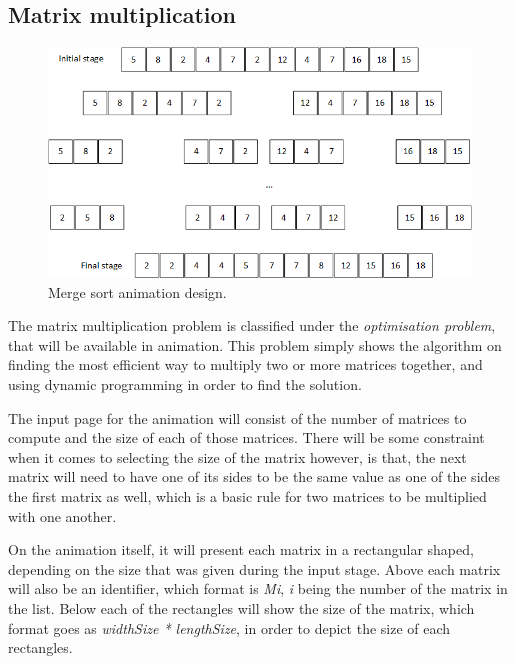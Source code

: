 \newspace

\subsection{Matrix multiplication}

\begin{figure}[H]
\centering
\includegraphics[scale=0.9]{images/report_images/animationDesignMergeSort.png}
\caption{Merge sort animation design.}
\label{animationDesignMergeSort}
\end{figure}

The matrix multiplication problem is classified under the \textit{optimisation problem}, that will be available in animation. This problem simply shows the algorithm on finding the most efficient way to multiply two or more matrices together, and using dynamic programming in order to find the solution. 

The input page for the animation will consist of the number of matrices to compute and the size of each of those matrices. There will be some constraint when it comes to selecting the size of the matrix however, is that, the next matrix will need to have one of its sides to be the same value as one of the sides the first matrix as well, which is a basic rule for two matrices to be multiplied with one another.

On the animation itself, it will present each matrix in a rectangular shaped, depending on the size that was given during the input stage. Above each matrix will also be an identifier, which format is \textit{Mi}, \textit{i} being the number of the matrix in the list. Below each of the rectangles will show the size of the matrix, which format goes as \textit{widthSize * lengthSize}, in order to depict the size of each rectangles.

